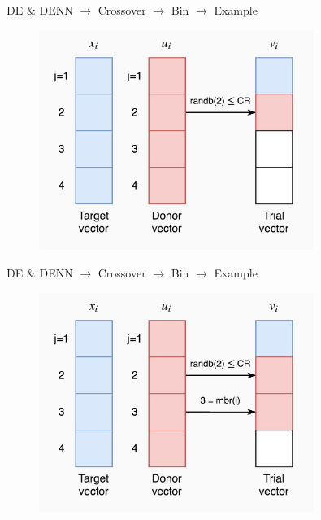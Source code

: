 \documentclass[xcolor={usenames}]{beamer}
\begin{document}
  \begin{frame}{DE \& DENN \(\rightarrow\) Crossover \(\rightarrow\) Bin \(\rightarrow\) Example}
	\begin{figure}
		\centering
		\includegraphics[width=0.8\textwidth]{../figures/bin-2.png}
	\end{figure}
  \end{frame}
  
  \begin{frame}{DE \& DENN \(\rightarrow\) Crossover \(\rightarrow\) Bin \(\rightarrow\) Example}
	\begin{figure}
		\centering
		\includegraphics[width=0.8\textwidth]{../figures/bin-3.png}
	\end{figure}
  \end{frame}
  
\end{document}
